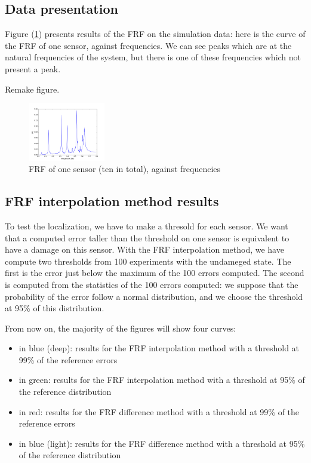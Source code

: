 \documentclass[journal]{IEEEtran}
\begin{document}
\subsection{Data presentation}

Figure (\ref{frf_freq}) presents results of the FRF on the simulation data: here is the curve of the FRF of one sensor, against frequencies. We can see peaks which are at the natural frequencies of the system, but there is one of these frequencies which not present a peak.

Remake figure.

\begin{figure}[h!]
  \centering
  \includegraphics[width=0.3\textwidth]{images/persensor1.png}
  \caption{FRF of one sensor (ten in total), against frequencies}
  \label{frf_freq}
\end{figure}



\subsection{FRF interpolation method results}

To test the localization, we have to make a thresold for each sensor. We want that a computed error taller than the threshold on one sensor is equivalent to have a damage on this sensor. With the FRF interpolation method, we have compute two thresholds from 100 experiments with the undameged state. The first is the error just below the maximum of the 100 errors computed. The second is computed from the statistics of the 100 errors computed: we suppose that the probability of the error follow a normal distribution, and we choose the threshold at 95\% of this distribution. 

From now on, the majority of the figures will show four curves:
\begin{itemize}
\item in blue (deep): results for the FRF interpolation method with a threshold at 99\% of the reference errors
\item in green: results for the FRF interpolation method with a threshold at 95\% of the reference distribution
\item in red: results for the FRF difference method with a threshold at 99\% of the reference errors
\item in blue (light): results for the FRF difference method with a threshold at 95\% of the reference distribution
\end{itemize}
\end{document}
